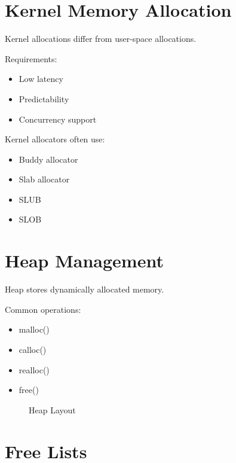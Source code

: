 \section{Kernel Memory Allocation}

Kernel allocations differ from user-space allocations.

Requirements:

\begin{itemize}
\item Low latency
\item Predictability
\item Concurrency support
\end{itemize}

Kernel allocators often use:

\begin{itemize}
\item Buddy allocator
\item Slab allocator
\item SLUB
\item SLOB
\end{itemize}

\section{Heap Management}

Heap stores dynamically allocated memory.

Common operations:

\begin{itemize}
\item malloc()
\item calloc()
\item realloc()
\item free()
\end{itemize}

\begin{figure}[H]
\centering
{}
\caption{Heap Layout}
\end{figure}

\section{Free Lists}

